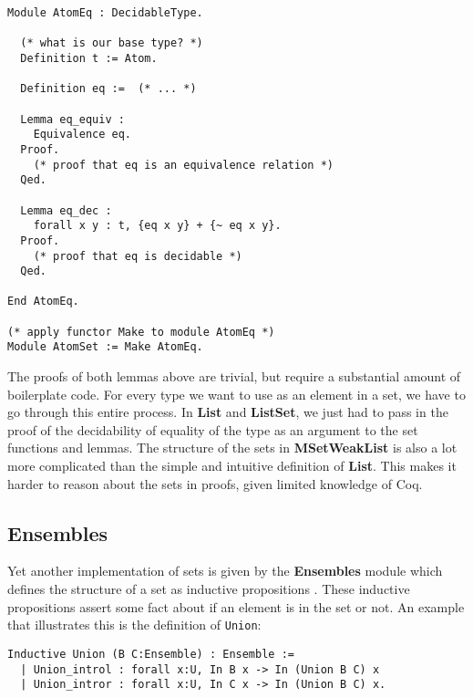 \begin{minipage}{\linewidth}
\begin{lstlisting}[language=Coq, label={lst:msetweaklist_ex1}, caption={Set of atoms in \lstinline{MSetWeakList} module}]
Module AtomEq : DecidableType.

  (* what is our base type? *)
  Definition t := Atom.

  Definition eq :=  (* ... *)

  Lemma eq_equiv :
    Equivalence eq.
  Proof.
    (* proof that eq is an equivalence relation *)
  Qed.

  Lemma eq_dec :
    forall x y : t, {eq x y} + {~ eq x y}.
  Proof.
    (* proof that eq is decidable *)
  Qed.

End AtomEq.

(* apply functor Make to module AtomEq *)
Module AtomSet := Make AtomEq.
\end{lstlisting}
\end{minipage}

The proofs of both lemmas above are trivial, but require a substantial amount of boilerplate code.
For every type we want to use as an element in a set, we have to go through this entire process.
In \textbf{List} and \textbf{ListSet}, we just had to pass in the proof of the decidability of equality of the type as an argument to the set functions and lemmas.
The structure of the sets in \textbf{MSetWeakList} is also a lot more complicated than the simple and intuitive definition of \textbf{List}.
This makes it harder to reason about the sets in proofs, given limited knowledge of Coq.

\subsection{Ensembles}
\label{ssec:ensembles}

Yet another implementation of sets is given by the \textbf{Ensembles} module
which defines the structure of a set as inductive propositions \cite{coqensembles}.
These inductive propositions assert some fact about if an element is in the set or not.
An example that illustrates this is the definition of \lstinline{Union}:

\begin{minipage}{\linewidth}
\begin{lstlisting}[language=Coq, label={lst:union_ensemble}, caption={\lstinline{Union} in \textbf{Ensembles} module}]
Inductive Union (B C:Ensemble) : Ensemble :=
  | Union_introl : forall x:U, In B x -> In (Union B C) x
  | Union_intror : forall x:U, In C x -> In (Union B C) x.
\end{lstlisting}
\end{minipage}

